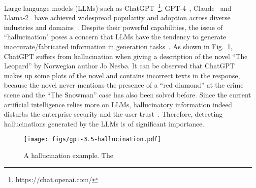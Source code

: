 Large language models (LLMs) such as ChatGPT~\footnote{https://chat.openai.com/}, GPT-4~\citep{openai2023gpt4}, Claude~\citep{claude} and Llama-2~\citep{touvron2023llama} have achieved widespread popularity and adoption across diverse industries and domains~\citep{sohail2023decoding,sallam2023chatgpt,chatgptapplication}. Despite their powerful capabilities, the issue of ``hallucination" poses a concern that LLMs have the tendency to generate inaccurate/fabricated information in generation tasks~\citep{zhang2023siren,ji2023survey}.
As shown in Fig.~\ref{fig:hallucination}, ChatGPT suffers from hallucination when giving a description of the novel ``The Leopard'' by Norwegian author Jo Nesbø. It can be observed that ChatGPT makes up some plots of the novel and contains incorrect texts in the response, because the novel never mentions the presence of a ``red diamond'' at the crime scene and the ``The Snowman'' case has also been solved before. Since the current artificial intelligence relies more on LLMs, hallucinatory information indeed disturbs the enterprise security and the user trust~\citep{snowball,threatgpt}. Therefore, detecting hallucinations generated by the LLMs is of significant importance.



\begin{figure}[h]
\centering
    \texttt{[image: figs/gpt-3.5-hallucination.pdf]}
    \caption{A hallucination example. The \color{red!80!black}{red} \color{black}{underline indicates the hallucinatory content.}}
    \label{fig:hallucination}
\end{figure}


